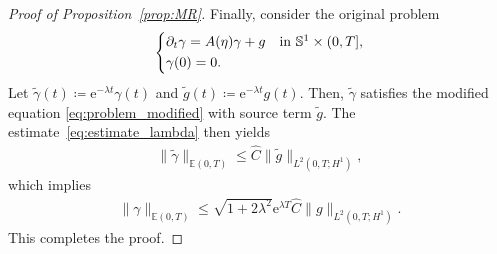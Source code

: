 \documentclass{article}
\theoremstyle{remark}
\theoremstyle{definition}
\numberwithin{equation}{section}
\begin{document}
\begin{proof}[Proof of Proposition~\ref{prop:MR}]
    Finally, consider the original problem
    \begin{align*}
        \begin{dcases*}
            \partial_t \gamma = A(\eta)\gamma + g & in $\mathbb{S}^1\times(0,T]$,\\
            \gamma(0) = 0.
        \end{dcases*}
    \end{align*}
    Let $\tilde{\gamma}(t)\coloneqq\mathrm{e}^{-\lambda t}\gamma(t)$ and $\tilde{g}(t) \coloneqq \mathrm{e}^{-\lambda t}g(t)$.
    Then, $\tilde{\gamma}$ satisfies the modified equation \eqref{eq:problem_modified} with source term $\tilde{g}$.
    The estimate~\eqref{eq:estimate_lambda} then yields
    \begin{align*}
        \|\tilde{\gamma}\|_{\mathbb{E}(0,T)} \le \hat{C}\|\tilde{g}\|_{L^2(0,T;H^1)},
    \end{align*}
    which implies
    \begin{align*}
        \|\gamma\|_{\mathbb{E}(0,T)} \le \sqrt{1+2\lambda^2}\mathrm{e}^{\lambda T}\hat{C}\|g\|_{L^2(0,T;H^1)}.
    \end{align*}
    This completes the proof.
\end{proof}
\end{document}
